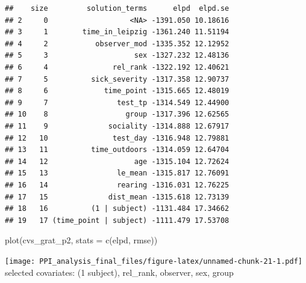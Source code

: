 \documentclass[
]{article}
\newenvironment{Shaded}{\begin{snugshade}}{\end{snugshade}}
\newcommand{\AttributeTok}[1]{\textcolor[rgb]{0.77,0.63,0.00}{#1}}
\newcommand{\FunctionTok}[1]{\textcolor[rgb]{0.00,0.00,0.00}{#1}}
\newcommand{\NormalTok}[1]{#1}
\newcommand{\StringTok}[1]{\textcolor[rgb]{0.31,0.60,0.02}{#1}}
\begin{document}
\begin{verbatim}
##    size         solution_terms      elpd  elpd.se
## 2     0                   <NA> -1391.050 10.18616
## 3     1        time_in_leipzig -1361.240 11.51194
## 4     2           observer_mod -1335.352 12.12952
## 5     3                    sex -1327.232 12.48136
## 6     4               rel_rank -1322.192 12.40621
## 7     5          sick_severity -1317.358 12.90737
## 8     6             time_point -1315.665 12.48019
## 9     7                test_tp -1314.549 12.44900
## 10    8                  group -1317.396 12.62565
## 11    9              sociality -1314.888 12.67917
## 12   10               test_day -1316.948 12.79881
## 13   11          time_outdoors -1314.059 12.64704
## 14   12                    age -1315.104 12.72624
## 15   13                le_mean -1315.817 12.76091
## 16   14                rearing -1316.031 12.76225
## 17   15              dist_mean -1315.618 12.73139
## 18   16          (1 | subject) -1131.484 17.34662
## 19   17 (time_point | subject) -1111.479 17.53708
\end{verbatim}

\begin{Shaded}
\begin{Highlighting}[]
\FunctionTok{plot}\NormalTok{(cvs\_grat\_p2, }\AttributeTok{stats =} \FunctionTok{c}\NormalTok{(}\StringTok{\textquotesingle{}elpd\textquotesingle{}}\NormalTok{, }\StringTok{\textquotesingle{}rmse\textquotesingle{}}\NormalTok{))}
\end{Highlighting}
\end{Shaded}

\texttt{[image: PPI\_analysis\_final\_files/figure-latex/unnamed-chunk-21-1.pdf]}
selected covariates: (1 \textbar{} subject), rel\_rank, observer, sex, group
\end{document}
